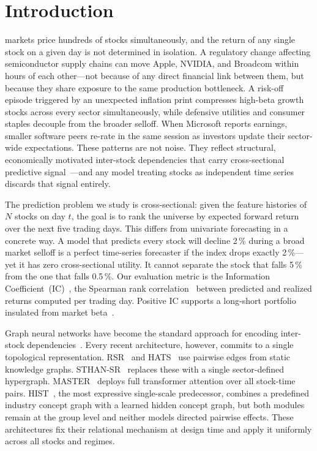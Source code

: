 \documentclass[journal]{IEEEtran}
\begin{document}
\maketitle
\IEEEdisplaynontitleabstractindextext
\IEEEpeerreviewmaketitle

\section{Introduction}

 markets price hundreds of stocks simultaneously,
and the return of any single stock on a given day is not determined in
isolation. A regulatory change affecting semiconductor supply chains can
move Apple, NVIDIA, and Broadcom within hours of each other---not because
of any direct financial link between them, but because they share
exposure to the same production bottleneck. A risk-off episode triggered
by an unexpected inflation print compresses high-beta growth stocks
across every sector simultaneously, while defensive utilities and
consumer staples decouple from the broader selloff. When Microsoft
reports earnings, smaller software peers re-rate in the same session as
investors update their sector-wide expectations. These patterns are not
noise. They reflect structural, economically motivated inter-stock
dependencies that carry cross-sectional predictive
signal~\cite{jegadeesh1993returns}---and any model treating stocks as
independent time series discards that signal entirely.

The prediction problem we study is cross-sectional: given the feature
histories of $N$ stocks on day $t$, the goal is to rank the universe
by expected forward return over the next five trading days. This differs
from univariate forecasting in a concrete way. A model that predicts
every stock will decline 2\,\% during a broad market selloff is a
perfect time-series forecaster if the index drops exactly 2\,\%---yet
it has zero cross-sectional utility. It cannot separate the stock that
falls 5\,\% from the one that falls 0.5\,\%. Our evaluation metric is
the Information Coefficient~(IC)~\cite{grinold2000active}, the Spearman
rank correlation~\cite{spearman1904} between predicted and realized
returns computed per trading day. Positive IC supports a long-short
portfolio insulated from market beta~\cite{grinold2000active}.

Graph neural networks have become the standard approach for encoding
inter-stock dependencies~\cite{patel2024gnn}. Every recent architecture,
however, commits to a single topological representation.
RSR~\cite{feng2019temporal} and HATS~\cite{kim2019hats} use pairwise
edges from static knowledge graphs. STHAN-SR~\cite{sawhney2021sthan}
replaces these with a single sector-defined hypergraph.
MASTER~\cite{li2024master} deploys full transformer attention over all
stock-time pairs. HIST~\cite{xu2021hist}, the most expressive
single-scale predecessor, combines a predefined industry concept graph
with a learned hidden concept graph, but both modules remain at the
group level and neither models directed pairwise effects. These
architectures fix their relational mechanism at design time and apply
it uniformly across all stocks and regimes.
\end{document}
